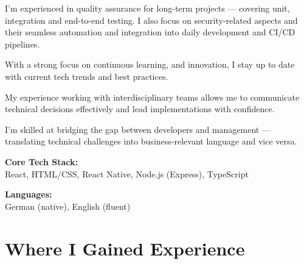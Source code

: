 \documentclass[a4paper,10pt]{article}
\begin{document}
\vspace{1em}

I’m experienced in quality assurance for long-term projects — covering unit,
integration and end-to-end testing. I also focus on security-related aspects
and their seamless automation and integration into daily development and CI/CD
pipelines.

\vspace{1em}

With a strong focus on continuous learning, and innovation, I stay up to date
with current tech trends and best practices.

\vspace{1em}

My experience working with interdisciplinary teams allows me to communicate
technical decisions effectively and lead implementations with confidence.

\vspace{1em}

I’m skilled at bridging the gap between developers and management — translating
technical challenges into business-relevant language and vice versa.

\vspace{1.5em}
\textbf{\textcolor{sectionblue}{Core Tech Stack:}}\\
React, HTML/CSS, React Native, Node.js (Express), TypeScript

\vspace{1.5em}
\textbf{\textcolor{sectionblue}{Languages:}}\\
German (native), English (fluent)

\section*{Where I Gained Experience}
\end{document}
